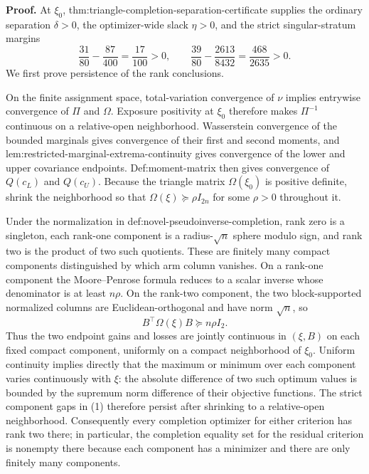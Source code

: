\textbf{Proof.}
At \(\xi_0\), thm:triangle-completion-separation-certificate supplies the ordinary separation \(\delta>0\), the optimizer-wide slack \(\eta>0\), and the strict singular-stratum margins
\[
\frac{31}{80}-\frac{87}{400}=\frac{17}{100}>0,
\qquad
\frac{39}{80}-\frac{2613}{8432}=\frac{468}{2635}>0.               \tag{1}
\]
We first prove persistence of the rank conclusions.

On the finite assignment space, total-variation convergence of \(\nu\) implies entrywise convergence of \(\Pi\) and \(\Omega\).  Exposure positivity at \(\xi_0\) therefore makes \(\Pi^{-1}\) continuous on a relative-open neighborhood.  Wasserstein convergence of the bounded marginals gives convergence of their first and second moments, and lem:restricted-marginal-extrema-continuity gives convergence of the lower and upper covariance endpoints.  Def:moment-matrix then gives convergence of \(Q(c_L)\) and \(Q(c_U)\).  Because the triangle matrix \(\Omega(\xi_0)\) is positive definite, shrink the neighborhood so that \(\Omega(\xi)\succeq\rho I_{2n}\) for some \(\rho>0\) throughout it.

Under the normalization in def:novel-pseudoinverse-completion, rank zero is a singleton, each rank-one component is a radius-\(\sqrt n\) sphere modulo sign, and rank two is the product of two such quotients.  These are finitely many compact components distinguished by which arm column vanishes.  On a rank-one component the Moore--Penrose formula reduces to a scalar inverse whose denominator is at least \(n\rho\).  On the rank-two component, the two block-supported normalized columns are Euclidean-orthogonal and have norm \(\sqrt n\), so
\[
B^{\top}\Omega(\xi)B\succeq n\rho I_2.                            \tag{2}
\]
Thus the two endpoint gains and losses are jointly continuous in \((\xi,B)\) on each fixed compact component, uniformly on a compact neighborhood of \(\xi_0\).  Uniform continuity implies directly that the maximum or minimum over each component varies continuously with \(\xi\): the absolute difference of two such optimum values is bounded by the supremum norm difference of their objective functions.  The strict component gaps in (1) therefore persist after shrinking to a relative-open neighborhood.  Consequently every completion optimizer for either criterion has rank two there; in particular, the completion equality set for the residual criterion is nonempty there because each component has a minimizer and there are only finitely many components.

